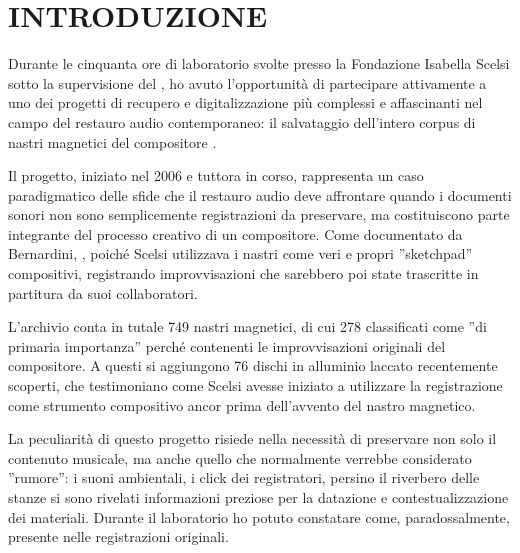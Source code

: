 
\section{INTRODUZIONE}
Durante le cinquanta ore di laboratorio svolte presso la Fondazione Isabella Scelsi sotto la supervisione del , ho avuto l'opportunità di partecipare attivamente a uno dei progetti di recupero e digitalizzazione più complessi e affascinanti nel campo del restauro audio contemporaneo: il salvataggio dell'intero corpus di nastri magnetici del compositore .

Il progetto, iniziato nel 2006 e tuttora in corso, rappresenta un caso paradigmatico delle sfide che il restauro audio deve affrontare quando i documenti sonori non sono semplicemente registrazioni da preservare, ma costituiscono parte integrante del processo creativo di un compositore. Come documentato da Bernardini, , poiché Scelsi utilizzava i nastri come veri e propri ''sketchpad'' compositivi, registrando improvvisazioni che sarebbero poi state trascritte in partitura da suoi collaboratori.

L'archivio conta in tutale 749 nastri magnetici, di cui 278 classificati come ''di primaria importanza'' perché contenenti le improvvisazioni originali del compositore\cite{pro:beracpmm4ch2011}. A questi si aggiungono 76 dischi in alluminio laccato recentemente scoperti, che testimoniano come Scelsi avesse iniziato a utilizzare la registrazione come strumento compositivo ancor prima dell'avvento del nastro magnetico\cite[p. 185]{pro:beracpmm4ch2011}.

La peculiarità di questo progetto risiede nella necessità di preservare non solo il contenuto musicale, ma anche quello che normalmente verrebbe considerato ''rumore'': i suoni ambientali, i click dei registratori, persino il riverbero delle stanze si sono rivelati informazioni preziose per la datazione e contestualizzazione dei materiali. Durante il laboratorio ho potuto constatare come, paradossalmente,  presente nelle registrazioni originali.

